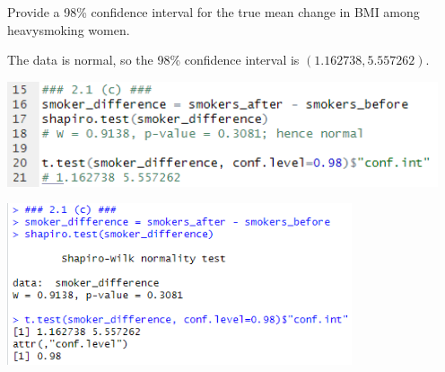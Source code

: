 Provide a 98\% confidence interval for the true mean change in BMI among heavysmoking women.

\soln* The data is normal, so the 98\% confidence interval is $(1.162738, 5.557262)$.

\nl \includegraphics*[width=5in]{img/2_1c_code.PNG}

\nl \includegraphics*[width=4in]{img/2_1c_console.PNG}
